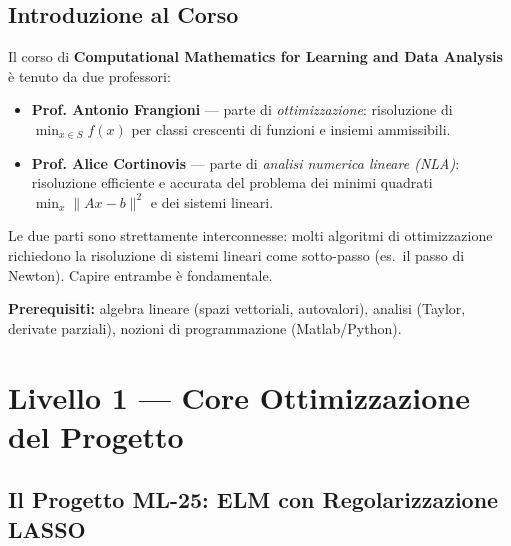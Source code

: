 \documentclass[11pt, a4paper, twoside]{book}
\theoremstyle{definition}
\theoremstyle{plain}
\theoremstyle{remark}
\begin{document}
\chapter*{Introduzione al Corso}

Il corso di \textbf{Computational Mathematics for Learning and Data Analysis} è tenuto da due professori:
\begin{itemize}
  \item \textbf{Prof. Antonio Frangioni} — parte di \emph{ottimizzazione}: risoluzione di $\min_{x \in S} f(x)$ per classi crescenti di funzioni e insiemi ammissibili.
  \item \textbf{Prof. Alice Cortinovis} — parte di \emph{analisi numerica lineare (NLA)}: risoluzione efficiente e accurata del problema dei minimi quadrati $\min_{x} \|Ax - b\|^2$ e dei sistemi lineari.
\end{itemize}

Le due parti sono strettamente interconnesse: molti algoritmi di ottimizzazione richiedono la risoluzione di sistemi lineari come sotto-passo (es.\ il passo di Newton). Capire entrambe è fondamentale.

\medskip
\textbf{Prerequisiti:} algebra lineare (spazi vettoriali, autovalori), analisi (Taylor, derivate parziali), nozioni di programmazione (Matlab/Python).


\part{Livello 1 --- Core Ottimizzazione del Progetto}
\label{part:L1-opt}

\chapter{Il Progetto ML-25: ELM con Regolarizzazione LASSO}
\label{ch:progetto}
\end{document}

